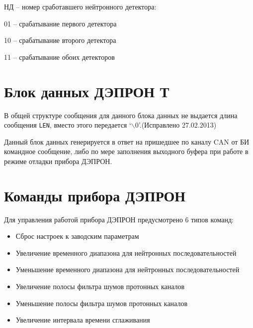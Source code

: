 \begin{flushleft}
	
\end{flushleft}


\begin{flushleft}
	НД -- номер сработавшего нейтронного детектора:
\end{flushleft}


\begin{flushleft}
	01 -- срабатывание первого детектора
\end{flushleft}


\begin{flushleft}
	10 -- срабатывание второго детектора
\end{flushleft}


\begin{flushleft}
	11 -- срабатывание обоих детекторов
\end{flushleft}




\section{Блок данных ДЭПРОН Т}

В общей структуре сообщения для данного блока данных не выдается длина сообщения \texttt{LEN}, вместо этого передается {`}\ensuremath{\backslash}0'.(Исправлено 27.02.2013)


Данный блок данных генерируется в ответ на пришедшее по каналу CAN от БИ командное сообщение, либо по мере заполнения выходного буфера при работе в режиме отладки прибора ДЭПРОН.



\section{Команды прибора ДЭПРОН}



Для управления работой прибора ДЭПРОН предусмотрено 6 типов команд:

\begin{itemize}
	\item 	Сброс настроек к заводским параметрам

	\item Увеличение временного диапазона для нейтронных последовательностей

	\item Уменьшение временного диапазона для нейтронных последовательностей

	\item Увеличение полосы фильтра шумов протонных каналов

	\item Уменьшение полосы фильтра шумов протонных каналов

	\item Увеличение интервала времени сглаживания

\end{itemize}





